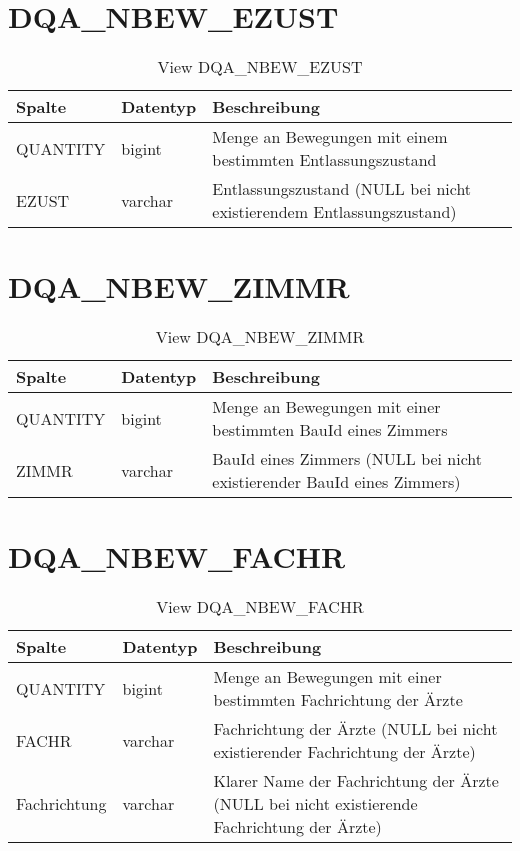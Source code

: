   \section{DQA\_NBEW\_EZUST}

  \begin{table}[ht]
    \centering
    \caption{View DQA\_NBEW\_EZUST}
    \label{tab:dqanbewezust}
    \begin{tabular}{||l|l|p{10cm}||}
      \hline
      Spalte & Datentyp & Beschreibung \\ [0.5ex] \hline \hline
QUANTITY & bigint & Menge an Bewegungen mit einem bestimmten Entlassungszustand \\ \hline
EZUST & varchar & Entlassungszustand (NULL bei nicht existierendem Entlassungszustand)\\ \hline
    \end{tabular}
  \end{table}
\clearpage
\section{DQA\_NBEW\_ZIMMR}

\begin{table}[ht]
	\centering
	\caption{View DQA\_NBEW\_ZIMMR}
	\label{tab:dqanbewzimmr}
	\begin{tabular}{||l|l|p{10cm}||}
		\hline
		Spalte & Datentyp & Beschreibung \\ [0.5ex] \hline \hline
		QUANTITY & bigint & Menge an Bewegungen mit einer bestimmten BauId eines Zimmers \\ \hline
		ZIMMR & varchar & BauId eines Zimmers (NULL bei nicht existierender BauId eines Zimmers)\\ \hline
	\end{tabular}
\end{table}

  \section{DQA\_NBEW\_FACHR}

  \begin{table}[ht]
    \centering
    \caption{View DQA\_NBEW\_FACHR}
    \label{tab:dqanbewfachr}
    \begin{tabular}{||l|l|p{10cm}||}
      \hline
      Spalte & Datentyp & Beschreibung \\ [0.5ex] \hline \hline
QUANTITY & bigint & Menge an Bewegungen mit einer bestimmten Fachrichtung der Ärzte \\ \hline
FACHR & varchar & Fachrichtung der Ärzte (NULL bei nicht existierender Fachrichtung der Ärzte)\\ \hline
Fachrichtung & varchar & Klarer Name der Fachrichtung der Ärzte (NULL bei nicht existierende Fachrichtung der Ärzte)\\ \hline
    \end{tabular}
  \end{table}

